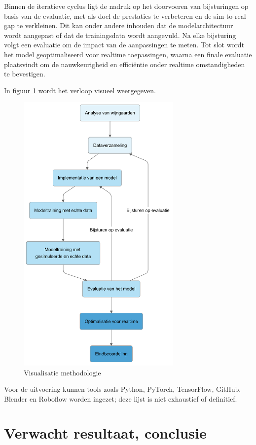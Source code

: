 Binnen de iteratieve cyclus ligt de nadruk op het doorvoeren van bijsturingen op basis van de evaluatie, met als doel de prestaties te verbeteren en de sim-to-real gap te verkleinen. Dit kan onder andere inhouden dat de modelarchitectuur wordt aangepast of dat de trainingsdata wordt aangevuld. Na elke bijsturing volgt een evaluatie om de impact van de aanpassingen te meten. Tot slot wordt het model geoptimaliseerd voor realtime toepassingen, waarna een finale evaluatie plaatsvindt om de nauwkeurigheid en efficiëntie onder realtime omstandigheden te bevestigen.

In figuur \ref{fig:met} wordt het verloop visueel weergegeven.

\begin{figure}[h]
    \includegraphics[width=8cm]{img/verloop.png}
    \caption{Visualisatie methodologie}
    \label{fig:met}
\end{figure}

Voor de uitvoering kunnen tools zoals Python, PyTorch, TensorFlow, GitHub, Blender en Roboflow worden ingezet; deze lijst is niet exhaustief of definitief.

\section{Verwacht resultaat, conclusie}%
\label{sec:verwachte_resultaten}

